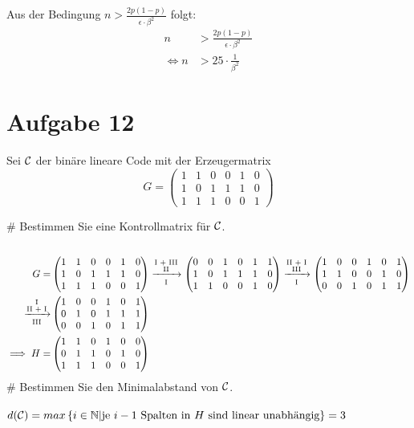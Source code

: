 \begin{myList}
Aus der Bedingung $n > \frac{2p(1-p)}{\epsilon \cdot \beta^2}$ folgt:
\begin{align*}
	n &> \frac{2p(1-p)}{\epsilon \cdot \beta^2}\\
	\Leftrightarrow n &> 25 \cdot \frac{1}{\beta^2}
\end{align*}
\end{myList}

\section*{Aufgabe 12}
Sei $\mathcal{C}$ der binäre lineare Code mit der Erzeugermatrix
\begin{equation*}
	G = \begin{pmatrix}
		1 & 1 & 0 & 0 & 1 & 0 \\
		1 & 0 & 1 & 1 & 1 & 0 \\
		1 & 1 & 1 & 0 & 0 & 1
	\end{pmatrix}
\end{equation*}
\begin{myList}
#
Bestimmen Sie eine Kontrollmatrix für $\mathcal{C}$.\\\\
\begin{align*}
G=&\begin{pmatrix}
1&1&0&0&1&0\\
1&0&1&1&1&0\\
1&1&1&0&0&1
\end{pmatrix}\lgsto{\rom 1 + \rom 3}{\rom 2}{\rom 1}{}\begin{pmatrix}
0&0&1&0&1&1\\
1&0&1&1&1&0\\
1&1&0&0&1&0
\end{pmatrix}\lgsto{\rom 2 + \rom 1}{\rom 3}{\rom 1}{}\begin{pmatrix}
1&0&0&1&0&1\\
1&1&0&0&1&0\\
0&0&1&0&1&1
\end{pmatrix}\\\lgsto{\rom 1}{\rom 2 + \rom 1}{\rom 3}{}&\begin{pmatrix}
1&0&0&1&0&1\\
0&1&0&1&1&1\\
0&0&1&0&1&1
\end{pmatrix}\\
\implies H=&\begin{pmatrix}
1&1&0&1&0&0\\
0&1&1&0&1&0\\
1&1&1&0&0&1
\end{pmatrix}
\end{align*}
#
Bestimmen Sie den Minimalabstand von $\mathcal{C}$.\\\\
$d(\mathcal{C})=max\left\lbrace i\in\mathbb{N}|\text{je $i-1$ Spalten in $H$ sind linear unabhängig} \right\rbrace=3$
\end{myList}


